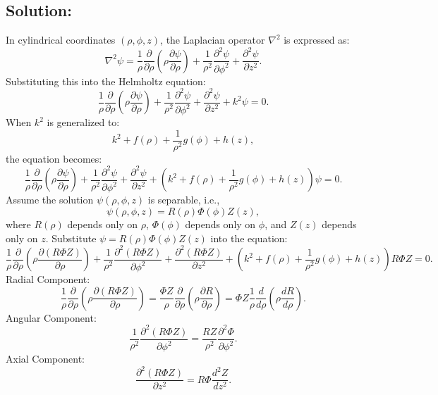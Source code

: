 \documentclass[12pt]{article}
\begin{document}
   \subsection*{Solution:}
        In cylindrical coordinates \((\rho, \phi, z)\), the Laplacian operator \(\nabla^2\) is expressed as:
        \[
        \nabla^2 \psi = \frac{1}{\rho} \frac{\partial}{\partial \rho} \left( \rho \frac{\partial \psi}{\partial \rho} \right) + \frac{1}{\rho^2} \frac{\partial^2 \psi}{\partial \phi^2} + \frac{\partial^2 \psi}{\partial z^2}.
        \]
        Substituting this into the Helmholtz equation:
        \[
        \frac{1}{\rho} \frac{\partial}{\partial \rho} \left( \rho \frac{\partial \psi}{\partial \rho} \right) + \frac{1}{\rho^2} \frac{\partial^2 \psi}{\partial \phi^2} + \frac{\partial^2 \psi}{\partial z^2} + k^2 \psi = 0.
        \]
        When \(k^2\) is generalized to:
        \[
        k^2 + f(\rho) + \frac{1}{\rho^2} g(\phi) + h(z),
        \]
        the equation becomes:
        \[
        \frac{1}{\rho} \frac{\partial}{\partial \rho} \left( \rho \frac{\partial \psi}{\partial \rho} \right) + \frac{1}{\rho^2} \frac{\partial^2 \psi}{\partial \phi^2} + \frac{\partial^2 \psi}{\partial z^2} + \left(k^2 + f(\rho) + \frac{1}{\rho^2} g(\phi) + h(z) \right) \psi = 0.
        \]
        Assume the solution \(\psi(\rho, \phi, z)\) is separable, i.e.,
        \[
        \psi(\rho, \phi, z) = R(\rho)\Phi(\phi)Z(z),
        \]
        where \(R(\rho)\) depends only on \(\rho\), \(\Phi(\phi)\) depends only on \(\phi\), and \(Z(z)\) depends only on \(z\).
        Substitute \(\psi = R(\rho)\Phi(\phi)Z(z)\) into the equation:
        \[
        \frac{1}{\rho} \frac{\partial}{\partial \rho} \left( \rho \frac{\partial (R\Phi Z)}{\partial \rho} \right) + \frac{1}{\rho^2} \frac{\partial^2 (R\Phi Z)}{\partial \phi^2} + \frac{\partial^2 (R\Phi Z)}{\partial z^2} + \left(k^2 + f(\rho) + \frac{1}{\rho^2} g(\phi) + h(z)\right) R\Phi Z = 0.
        \]
        Radial Component:
        \[
        \frac{1}{\rho} \frac{\partial}{\partial \rho} \left( \rho \frac{\partial (R\Phi Z)}{\partial \rho} \right) = \frac{\Phi Z}{\rho} \frac{\partial}{\partial \rho} \left( \rho \frac{\partial R}{\partial \rho} \right) = \Phi Z \frac{1}{\rho} \frac{d}{d \rho} \left( \rho \frac{dR}{d\rho} \right).
        \]
        Angular Component:
        \[
        \frac{1}{\rho^2} \frac{\partial^2 (R\Phi Z)}{\partial \phi^2} = \frac{RZ}{\rho^2} \frac{\partial^2 \Phi}{\partial \phi^2}.
        \]
        Axial Component:
        \[
        \frac{\partial^2 (R\Phi Z)}{\partial z^2} = R\Phi \frac{d^2 Z}{dz^2}.
        \]
\end{document}

